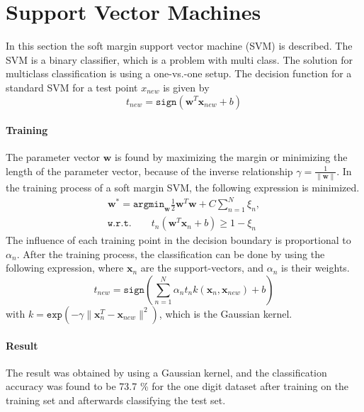 \section*{Support Vector Machines}
In this section the soft margin support vector machine (SVM) is described. 
The SVM is a binary classifier, which is a problem with multi class. 
The solution for multiclass classification is using a one-vs.-one setup.
The decision function for a standard SVM for a test point $ x_{new} $ is given by
\begin{equation}
t_{new} = \mathtt{sign}(\mathbf{w}^T \mathbf{x}_{new} +b)
\label{eq:SVM_lin}
\end{equation}

\paragraph*{Training}
The parameter vector $ \mathbf{w} $ is found by maximizing the margin or minimizing the length of the parameter vector, because of the inverse relationship $ \gamma = \frac{1}{\|\mathbf{w}\|} $.
In the training process of a soft margin SVM, the following expression is minimized. 
\begin{align}
\mathbf{w}^* = 
\mathtt{argmin}_\mathbf{w} \frac{1}{2} \mathbf{w}^T \mathbf{w}+C \sum_{n=1}^{N} \xi_n,\\ \mathtt{w.r.t.} \qquad t_n(\mathbf{w}^T \mathbf{x}_n + b) \geq 1-\xi_n
\end{align} 
The influence of each training point in the decision boundary is proportional to $ \alpha_n $.
After the training process, the classification can be done by using the following expression, where $ \mathbf{x}_n $  are the support-vectors, and $ \alpha_n $ is their weights.
\begin{equation}
t_{new} = 
\mathtt{sign}\left( \sum_{n=1}^{N} \alpha_n t_n k(\mathbf{x}_n,\mathbf{x}_{new}) +b  \right)
\end{equation}
with $ k = \mathtt{exp}(-\gamma \|\mathbf{x}^T_n - \mathbf{x}_{new} \|^2 ) $, which is the Gaussian kernel.

\paragraph*{Result}
The result was obtained by using a Gaussian kernel, and the classification accuracy was found to be 73.7 \% for the one digit dataset after training on the training set and afterwards classifying the test set.